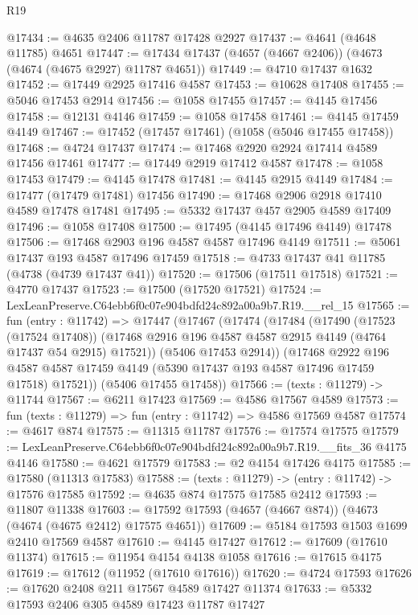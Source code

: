 \begin{lexlean}{R19}
\begin{coremodule}
@17434 := @4635 @2406 @11787 @17428 @2927
@17437 := @4641 (@4648 @11785) @4651
@17447 := @17434 @17437 (@4657 (@4667 @2406)) (@4673 (@4674 (@4675 @2927) @11787 @4651))
@17449 := @4710 @17437 @1632
@17452 := @17449 @2925 @17416 @4587
@17453 := @10628 @17408
@17455 := @5046 @17453 @2914
@17456 := @1058 @17455
@17457 := @4145 @17456
@17458 := @12131 @4146
@17459 := @1058 @17458
@17461 := @4145 @17459 @4149
@17467 := @17452 (@17457 @17461) (@1058 (@5046 @17455 @17458))
@17468 := @4724 @17437
@17474 := @17468 @2920 @2924 @17414 @4589 @17456 @17461
@17477 := @17449 @2919 @17412 @4587
@17478 := @1058 @17453
@17479 := @4145 @17478
@17481 := @4145 @2915 @4149
@17484 := @17477 (@17479 @17481) @17456
@17490 := @17468 @2906 @2918 @17410 @4589 @17478 @17481
@17495 := @5332 @17437 @457 @2905 @4589 @17409
@17496 := @1058 @17408
@17500 := @17495 (@4145 @17496 @4149) @17478
@17506 := @17468 @2903 @196 @4587 @4587 @17496 @4149
@17511 := @5061 @17437 @193 @4587 @17496 @17459
@17518 := @4733 @17437 @41 @11785 (@4738 (@4739 @17437 @41))
@17520 := @17506 (@17511 @17518)
@17521 := @4770 @17437
@17523 := @17500 (@17520 @17521)
@17524 := LexLeanPreserve.C64ebb6f0c07e904bdfd24c892a00a9b7.R19.__rel_15
@17565 := fun (entry : @11742) =>
  @17447
    (@17467
      (@17474
        (@17484
          (@17490
            (@17523 (@17524 @17408))
            (@17468 @2916 @196 @4587 @4587 @2915 @4149 (@4764 @17437 @54 @2915) @17521))
          (@5406 @17453 @2914))
        (@17468
          @2922
          @196
          @4587
          @4587
          @17459
          @4149
          (@5390 @17437 @193 @4587 @17496 @17459 @17518)
          @17521))
      (@5406 @17455 @17458))
@17566 := (texts : @11279) -> @11744
@17567 := @6211 @17423
@17569 := @4586 @17567 @4589
@17573 := fun (texts : @11279) => fun (entry : @11742) => @4586 @17569 @4587
@17574 := @4617 @874
@17575 := @11315 @11787
@17576 := @17574 @17575
@17579 := LexLeanPreserve.C64ebb6f0c07e904bdfd24c892a00a9b7.R19.__fits_36 @4175 @4146
@17580 := @4621 @17579
@17583 := @2 @4154 @17426 @4175
@17585 := @17580 (@11313 @17583)
@17588 := (texts : @11279) -> (entry : @11742) -> @17576 @17585
@17592 := @4635 @874 @17575 @17585 @2412
@17593 := @11807 @11338
@17603 := @17592 @17593 (@4657 (@4667 @874)) (@4673 (@4674 (@4675 @2412) @17575 @4651))
@17609 := @5184 @17593 @1503 @1699 @2410 @17569 @4587
@17610 := @4145 @17427
@17612 := @17609 (@17610 @11374)
@17615 := @11954 @4154 @4138 @1058
@17616 := @17615 @4175
@17619 := @17612 (@11952 (@17610 @17616))
@17620 := @4724 @17593
@17626 := @17620 @2408 @211 @17567 @4589 @17427 @11374
@17633 := @5332 @17593 @2406 @305 @4589 @17423 @11787 @17427

\end{coremodule}
\end{lexlean}
